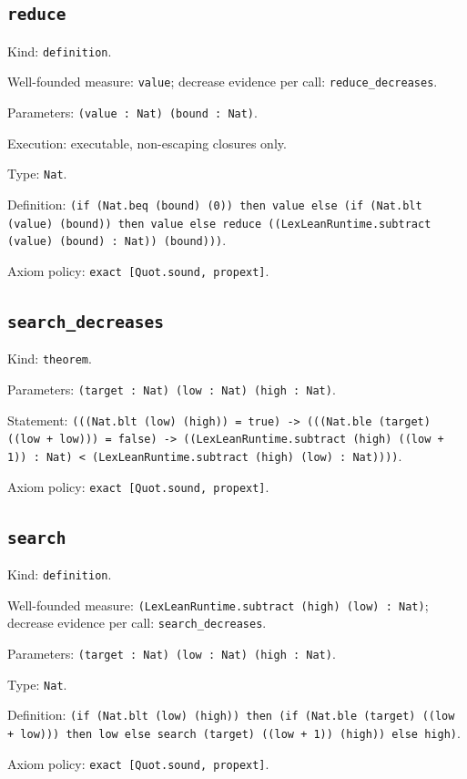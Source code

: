 \documentclass[11pt]{article}
\begin{document}
\subsection*{\texttt{reduce}}
\noindent Kind: \texttt{definition}.\par
\noindent Well-founded measure: \texttt{value}; decrease evidence per call: \texttt{reduce\_decreases}.\par
\noindent Parameters: \texttt{(value : Nat) (bound : Nat)}.\par
\noindent Execution: executable, non-escaping closures only.\par
\noindent Type: \texttt{Nat}.\par
\noindent Definition: \texttt{(if (Nat.beq (bound) (0)) then value else (if (Nat.blt (value) (bound)) then value else reduce ((LexLeanRuntime.subtract (value) (bound) : Nat)) (bound)))}.\par
\noindent Axiom policy: \texttt{exact [Quot.sound, propext]}.\par
\subsection*{\texttt{search\_decreases}}
\noindent Kind: \texttt{theorem}.\par
\noindent Parameters: \texttt{(target : Nat) (low : Nat) (high : Nat)}.\par
\noindent Statement: \texttt{(((Nat.blt (low) (high)) = true) -> (((Nat.ble (target) ((low + low))) = false) -> ((LexLeanRuntime.subtract (high) ((low + 1)) : Nat) < (LexLeanRuntime.subtract (high) (low) : Nat))))}.\par
\noindent Axiom policy: \texttt{exact [Quot.sound, propext]}.\par
\subsection*{\texttt{search}}
\noindent Kind: \texttt{definition}.\par
\noindent Well-founded measure: \texttt{(LexLeanRuntime.subtract (high) (low) : Nat)}; decrease evidence per call: \texttt{search\_decreases}.\par
\noindent Parameters: \texttt{(target : Nat) (low : Nat) (high : Nat)}.\par
\noindent Type: \texttt{Nat}.\par
\noindent Definition: \texttt{(if (Nat.blt (low) (high)) then (if (Nat.ble (target) ((low + low))) then low else search (target) ((low + 1)) (high)) else high)}.\par
\noindent Axiom policy: \texttt{exact [Quot.sound, propext]}.\par
\end{document}
